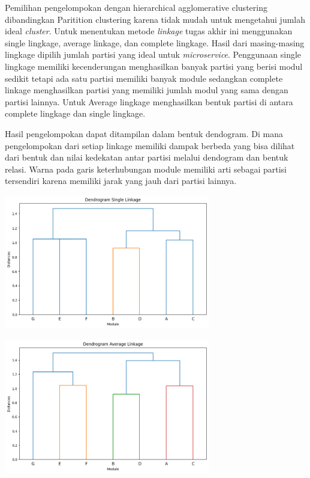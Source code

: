 Pemilihan pengelompokan dengan hierarchical agglomerative clustering dibandingkan Paritition clustering karena tidak mudah untuk mengetahui jumlah ideal \textit{cluster}. Untuk menentukan metode \textit{linkage} tugas akhir ini menggunakan single lingkage, average linkage, dan complete lingkage. Hasil dari masing-masing lingkage dipilih jumlah partisi yang ideal untuk \textit{microservice}. Penggunaan single lingkage memiliki kecenderungan menghasilkan banyak partisi yang berisi modul sedikit tetapi ada satu partisi memiliki banyak module sedangkan complete linkage menghasilkan partisi yang memiliki jumlah modul yang sama dengan partisi lainnya. Untuk Average lingkage menghasilkan bentuk partisi di antara complete lingkage dan single lingkage.

Hasil pengelompokan dapat ditampilan dalam bentuk dendogram.  Di mana pengelompokan dari setiap linkage memiliki dampak berbeda yang bisa dilihat dari bentuk dan nilai kedekatan antar partisi melalui dendogram dan bentuk relasi. Warna pada garis keterhubungan module memiliki arti sebagai partisi tersendiri karena memiliki jarak yang jauh dari partisi lainnya. 
\begin{center}
	\includegraphics[width=9cm]{img/bab_3/singleLink.png}
	\label{fig:asd}
\end{center}
\begin{center}
	\includegraphics[width=9cm]{img/bab_3/averageLink.png}
	\label{fig:asd}
\end{center}
